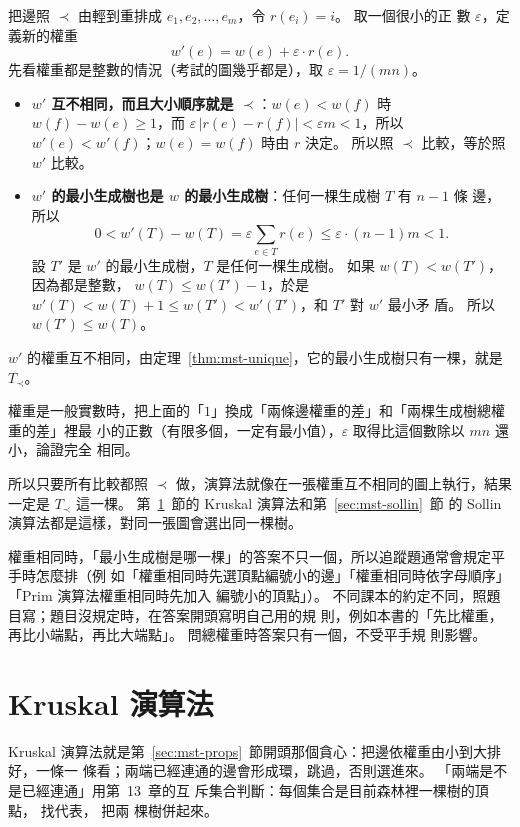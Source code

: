 \begin{whybox}
把邊照 $\prec$ 由輕到重排成 $e_1, e_2, \ldots, e_m$，令 $r(e_i) = i$。 取一個很小的正
數 $\varepsilon$，定義新的權重
\[
w'(e) = w(e) + \varepsilon \cdot r(e).
\]
先看權重都是整數的情況（考試的圖幾乎都是），取 $\varepsilon = 1/(mn)$。
\begin{itemize}
\item \textbf{$w'$ 互不相同，而且大小順序就是 $\prec$}：$w(e) < w(f)$ 時 $w(f) - w(e) \ge
1$，而 $\varepsilon\,|r(e) - r(f)| < \varepsilon m < 1$，所以 $w'(e) < w'(f)$；$w(e) = w(f)$
時由 $r$ 決定。 所以照 $\prec$ 比較，等於照 $w'$ 比較。
\item \textbf{$w'$ 的最小生成樹也是 $w$ 的最小生成樹}：任何一棵生成樹 $T$ 有 $n - 1$ 條
邊，所以
\[
0 < w'(T) - w(T) = \varepsilon \sum_{e \in T} r(e) \le \varepsilon \cdot (n - 1) m < 1.
\]
設 $T'$ 是 $w'$ 的最小生成樹，$T$ 是任何一棵生成樹。 如果 $w(T) < w(T')$，因為都是整數，
$w(T) \le w(T') - 1$，於是 $w'(T) < w(T) + 1 \le w(T') < w'(T')$，和 $T'$ 對 $w'$ 最小矛
盾。 所以 $w(T') \le w(T)$。
\end{itemize}
$w'$ 的權重互不相同，由定理~\ref{thm:mst-unique}，它的最小生成樹只有一棵，就是 $T_{\prec}$。

權重是一般實數時，把上面的「$1$」換成「兩條邊權重的差」和「兩棵生成樹總權重的差」裡最
小的正數（有限多個，一定有最小值），$\varepsilon$ 取得比這個數除以 $mn$ 還小，論證完全
相同。
\end{whybox}

所以只要所有比較都照 $\prec$ 做，演算法就像在一張權重互不相同的圖上執行，結果一定是
$T_{\prec}$ 這一棵。 第~\ref{sec:mst-kruskal}~節的 Kruskal 演算法和第~\ref{sec:mst-sollin}~節
的 Sollin 演算法都是這樣，對同一張圖會選出同一棵樹。

\begin{examnote}
權重相同時，「最小生成樹是哪一棵」的答案不只一個，所以追蹤題通常會規定平手時怎麼排（例
如「權重相同時先選頂點編號小的邊」「權重相同時依字母順序」「Prim 演算法權重相同時先加入
編號小的頂點」）。 不同課本的約定不同，照題目寫；題目沒規定時，在答案開頭寫明自己用的規
則，例如本書的「先比權重，再比小端點，再比大端點」。 問總權重時答案只有一個，不受平手規
則影響。
\end{examnote}

\section{Kruskal 演算法}
\label{sec:mst-kruskal}

Kruskal 演算法就是第~\ref{sec:mst-props}~節開頭那個貪心：把邊依權重由小到大排好，一條一
條看；兩端已經連通的邊會形成環，跳過，否則選進來。 「兩端是不是已經連通」用第~13~章的互
斥集合判斷：每個集合是目前森林裡一棵樹的頂點， 找代表， 把兩
棵樹併起來。

